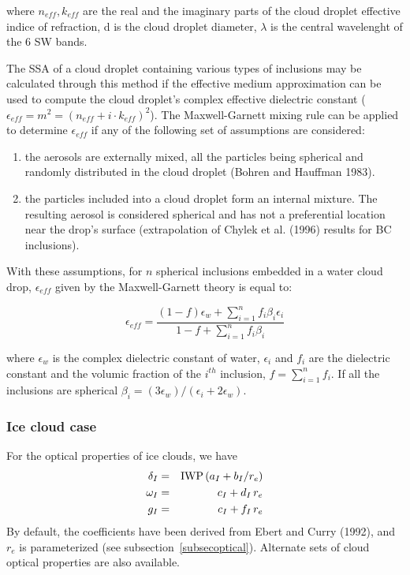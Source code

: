 where $n_{eff},k_{eff}$ are the real and the imaginary parts of the cloud droplet effective indice of refraction, d is the cloud droplet diameter, $\lambda$ is the central wavelenght of the 6 SW bands.

The SSA of a cloud droplet containing various types of inclusions may be calculated through this method if the effective medium approximation can be used to compute the cloud droplet's complex effective dielectric constant ($\epsilon_{eff}=m^2=(n_{eff}+i\cdot k_{eff})^2$). The Maxwell-Garnett mixing rule can be applied to determine $\epsilon_{eff}$ if any of the following set of assumptions are considered: 
\begin{enumerate}
\item the aerosols are externally mixed, all the particles being spherical and randomly distributed in the cloud droplet (Bohren and Hauffman 1983). 
\item the particles included into a cloud droplet form an internal mixture. The resulting aerosol is considered spherical and has not a preferential location near the drop's surface (extrapolation of Chylek et al. (1996) results for BC inclusions).
\end{enumerate}
With these assumptions, for $n$ spherical inclusions embedded in a water cloud drop, $\epsilon_{eff}$ given by the Maxwell-Garnett theory is equal to:

\begin{equation}
\epsilon_{eff}=\frac{(1-f)\epsilon_w+\sum_{i=1}^n f_i \beta_i \epsilon_i}{1-f+\sum_{i=1}^n f_i \beta_i}
 \end{equation}

where $\epsilon_w$ is the complex dielectric constant of water, $\epsilon_i$ and $f_i$ are the dielectric constant and the volumic fraction of the $i^{th}$ inclusion, $f=\sum_{i=1}^n f_i$. If all the inclusions are spherical $\beta_i=(3 \epsilon_w)/(\epsilon_i+2 \epsilon_w)$.

%
\subsubsection{Ice cloud case}
%
For the optical properties of ice clouds, we have
\begin{eqnarray}
\delta_{I} &=& {\rm IWP}\, (a_{I} + b_{I} / r_{e} )\cr
\omega_{I} &=& c_{I}  + d_{I}\, r_{e} \cr
g_I        &=& c_{I} + f_{I}\,r_{e}
\end{eqnarray}
By default,  the coefficients have been derived from Ebert and Curry (1992),
and $r_{e}$ is parameterized (see subsection~\ref{subsecoptical}).
Alternate sets of cloud optical properties are also available.

